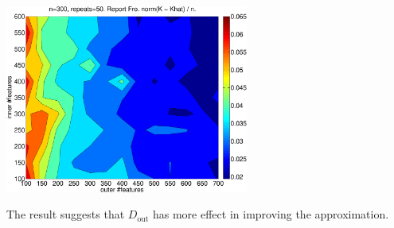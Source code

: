\documentclass[english]{article}
\theoremstyle{plain}
\theoremstyle{plain}
\begin{document}
\includegraphics[width=8cm]{img/kggauss_rf_grid-crop} 

The result suggests that $D_\mathrm{out}$ has more effect in improving the
approximation.

\end{document}
